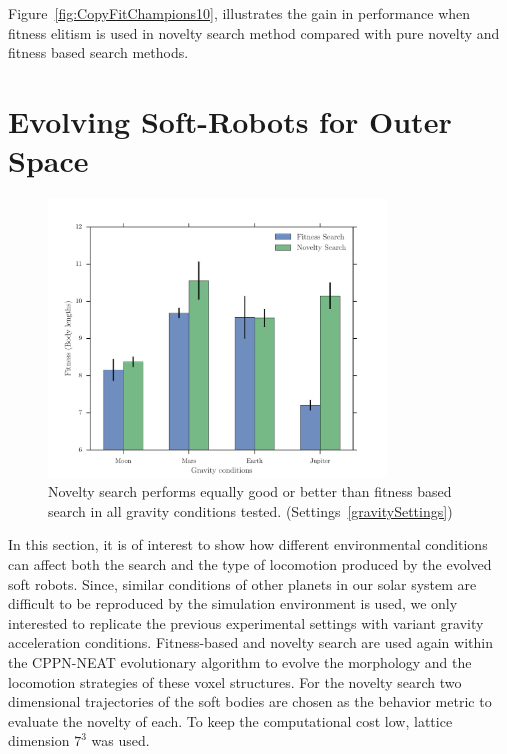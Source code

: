 Figure~\ref{fig:CopyFitChampions10}, illustrates the gain in performance when fitness elitism is used in novelty search method compared with pure novelty and fitness based search methods.
















\clearpage

\section{Evolving Soft-Robots for Outer Space}  

\begin{figure}[t!]
\centering
\includegraphics[width=0.8\textwidth]{../Figures/Results/GravityExperiment.pdf}
\caption{Novelty search performs equally good or better than fitness based search in all gravity conditions tested. (Settings~\ref{gravitySettings})}
\label{fig:gravityConditions}
\end{figure}

In this section, it is of interest to show how different environmental conditions can affect both the search and the type of locomotion produced by the evolved soft robots. Since, similar conditions of other planets in our solar system are difficult to be reproduced by the simulation environment is used, we only interested to replicate the previous experimental settings with variant gravity acceleration conditions. Fitness-based and novelty search are used again within the CPPN-NEAT evolutionary algorithm to evolve the morphology and the locomotion strategies of these voxel structures. For the novelty search two dimensional trajectories of the soft bodies are chosen as the behavior metric to evaluate the novelty of each. To keep the computational cost low, lattice dimension $7^3$ was used.


